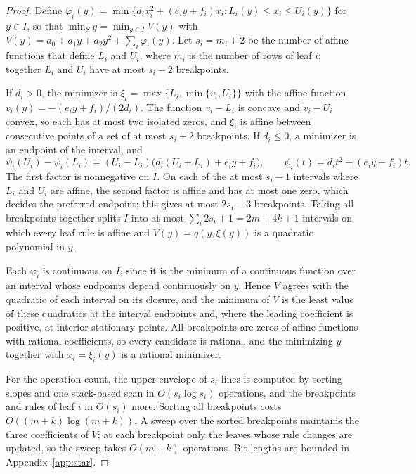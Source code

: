 \begin{proof}
Define $\varphi_i(y)=\min\{d_ix_i^2+(e_iy+f_i)x_i:L_i(y)\le x_i\le U_i(y)\}$
for $y\in I$, so that $\min_Sq=\min_{y\in I}V(y)$ with
$V(y)=a_0+a_1y+a_2y^2+\sum_i\varphi_i(y)$. Let $s_i=m_i+2$ be the number of
affine functions that define $L_i$ and $U_i$, where $m_i$ is the number of
rows of leaf $i$; together $L_i$ and $U_i$ have at most $s_i-2$ breakpoints.

If $d_i>0$, the minimizer is $\xi_i=\max\{L_i,\min\{v_i,U_i\}\}$ with the
affine function $v_i(y)=-(e_iy+f_i)/(2d_i)$. The function $v_i-L_i$ is
concave and $v_i-U_i$ convex, so each has at most two isolated zeros, and
$\xi_i$ is affine between consecutive points of a set of at most $s_i+2$
breakpoints. If $d_i\le0$, a minimizer is an endpoint of the interval, and
\begin{equation}\label{eq:endpoint-factor}
\psi_i(U_i)-\psi_i(L_i)=(U_i-L_i)\bigl(d_i(U_i+L_i)+e_iy+f_i\bigr),
\qquad\psi_i(t)=d_it^2+(e_iy+f_i)t .
\end{equation}
The first factor is nonnegative on $I$. On each of the at most $s_i-1$
intervals where $L_i$ and $U_i$ are affine, the second factor is affine and
has at most one zero, which decides the preferred endpoint; this gives at
most $2s_i-3$ breakpoints. Taking all breakpoints together splits $I$ into
at most $\sum_i2s_i+1=2m+4k+1$ intervals on which every leaf rule is affine
and $V(y)=q(y,\xi(y))$ is a quadratic polynomial in $y$.

Each $\varphi_i$ is continuous on $I$, since it is the minimum of a
continuous function over an interval whose endpoints depend continuously
on $y$. Hence $V$ agrees with the quadratic of each interval on its
closure, and the minimum of $V$ is the least value of these quadratics at
the interval endpoints and, where the leading coefficient is positive, at
interior stationary points. All breakpoints are zeros of affine functions
with rational coefficients, so every candidate is rational, and the
minimizing $y$ together with $x_i=\xi_i(y)$ is a rational minimizer.

For the operation count, the upper envelope of $s_i$ lines is computed by
sorting slopes and one stack-based scan in $O(s_i\log s_i)$ operations, and
the breakpoints and rules of leaf $i$ in $O(s_i)$ more. Sorting all
breakpoints costs $O((m+k)\log(m+k))$. A sweep over the sorted breakpoints
maintains the three coefficients of $V$; at each breakpoint only the
leaves whose rule changes are updated, so the sweep takes $O(m+k)$
operations. Bit lengths are bounded in Appendix~\ref{app:star}.
\end{proof}

